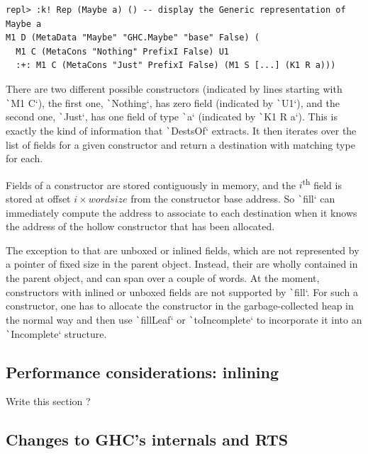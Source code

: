 \documentclass[english]{jflart}
\newcommand{\TODO}[1]{{\color{red}\large #1}}
\begin{document}
{\small
\begin{verbatim}
repl> :k! Rep (Maybe a) () -- display the Generic representation of Maybe a
M1 D (MetaData "Maybe" "GHC.Maybe" "base" False) (
  M1 C (MetaCons "Nothing" PrefixI False) U1
  :+: M1 C (MetaCons "Just" PrefixI False) (M1 S [...] (K1 R a)))
\end{verbatim}
}

There are two different possible constructors (indicated by lines starting with \texttt`M1 C`), the first one, \texttt`Nothing`, has zero field (indicated by \texttt`U1`), and the second one, \texttt`Just`, has one field of type \texttt`a` (indicated by \texttt`K1 R a`). This is exactly the kind of information that \texttt`DestsOf` extracts. It then iterates over the list of fields for a given constructor and return a destination with matching type for each.

Fields of a constructor are stored contiguously in memory, and the $i$\textsuperscript{th} field is stored at offset $i \times wordsize$ from the constructor base address. So \texttt`fill` can immediately compute the address to associate to each destination when it knows the address of the hollow constructor that has been allocated.

The exception to that are unboxed or inlined fields, which are not represented by a pointer of fixed size in the parent object. Instead, their are wholly contained in the parent object, and can span over a couple of words. At the moment, constructors with inlined or unboxed fields are not supported by \texttt`fill`. For such a constructor, one has to allocate the constructor in the garbage-collected heap in the normal way and then use \texttt`fillLeaf` or \texttt`toIncomplete` to incorporate it into an \texttt`Incomplete` structure.

\subsection{Performance considerations: inlining}

\TODO{Write this section ?}

\subsection{Changes to GHC's internals and RTS}
\end{document}

